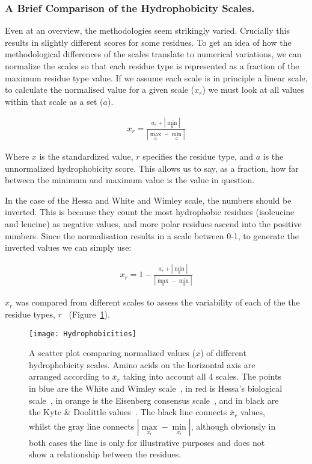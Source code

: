 \subsubsection{A Brief Comparison of the Hydrophobicity Scales.}

Even at an overview, the methodologies seem strikingly varied. Crucially this results in slightly different scores for some residues. To get an idea of how the methodological differences of the scales translate to numerical variations, we can normalize the scales so that each residue type is represented as a fraction of the maximum residue type value. If we assume each scale is in principle a linear scale, to calculate the normalised value for a given scale ($x_r$) we must look at all values within that scale as a set ($ a $).

\begin{align*}
  x_r= \frac{a_r+|\underset{a}{\min}|}{|\underset{a}{\max}-\underset{a}{\min}|}
\end{align*}

Where $x$ is the standardized value, $r$ specifies the residue type, and $a$ is the unnormalized hydrophobicity score. This allows us to say, as a fraction, how far between the minimum and maximum value is the value in question.

In the case of the Hessa and White and Wimley scale, the numbers should be inverted. This is because they count the most hydrophobic residues (isoleucine and leucine) as negative values, and more polar residues ascend into the positive numbers. Since the normalisation results in a scale between 0-1, to generate the inverted values we can simply use:


\begin{align*}
  x_r= 1- \frac{a_r+|\underset{a}{\min}|}{|\underset{a}{\max}-\underset{a}{\min}|}
\end{align*}


$x_r$ was compared from different scales to assess the variability of each of the the residue types, $ r $ \ (Figure~\ref{fig:normalisedhydrophobicity1}).

\begin{figure}[!ht]
\centering
\texttt{[image: Hydrophobicities]}
\caption{A scatter plot comparing normalized values ($x$) of different hydrophobicity scales. Amino acids on the horizontal axis are arranged according to ${\bar{x}}_{r}$ taking into account all 4 scales. The points in blue are the White and Wimley scale~\cite{White1999}, in red is Hessa's biological scale~\cite{Hessa2005}, in orange is the Eisenberg consensus scale~\cite{Eisenberg1984}, and in black are the Kyte \& Doolittle values~\cite{Kyte1982}. The black line connects ${\bar{x}}_{r}$ values, whilst the gray line connects $|\underset{x_r}{\max}-\underset{x_r}{\min}|$, although obviously in both cases the line is only for illustrative purposes and does not show a relationship between the residues.}
\label{fig:normalisedhydrophobicity1}
\end{figure}

